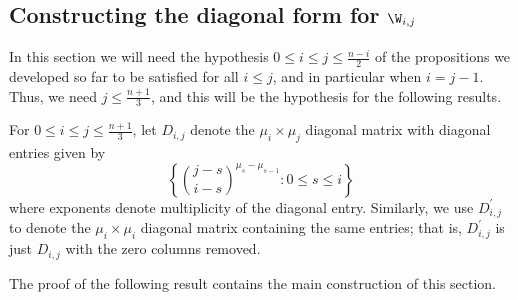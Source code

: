 \subsection{Constructing the diagonal form for \texorpdfstring{$\W_{i,j}$}{Wij}}

In this section we will need the hypothesis $0 \leq i \leq j \leq \frac{n-i}{2}$ of the propositions we developed so far to be satisfied for all $i \leq j$, and in particular when $i = j-1$.  Thus, we need $j \leq \frac{n+1}{3}$, and this will be the hypothesis for the following results.

\begin{definition}\label{d:diag_for_w}
For $0 \leq i \leq j \leq \frac{n+1}{3}$, let $D_{i,j}$ denote the $\mu_{i} \times \mu_{j}$ diagonal matrix with diagonal entries given by 
\[ \left\{ \binom{j-s}{i-s}^{\mu_s - \mu_{s-1}} : 0 \leq s \leq i \right\} \]
where exponents denote multiplicity of the diagonal entry.  Similarly, we use $D_{i,j}^{\prime}$ to denote the $\mu_{i} \times \mu_{i}$ diagonal matrix containing the same entries; that is, $D_{i,j}^{\prime}$ is just $D_{i,j}$ with the zero columns removed.
\end{definition}

The proof of the following result contains the main construction of this section.

